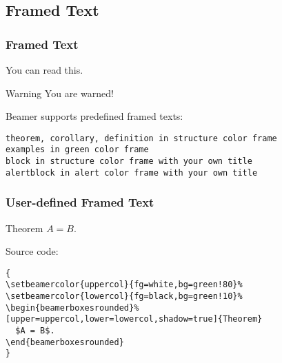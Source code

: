 \subsection{Framed Text}
\begin{frame}[fragile]
\frametitle{Framed Text}

  \begin{theorem}
    You can read this.
  \end{theorem}

  \begin{alertblock}{Warning}
    You are warned!
  \end{alertblock}

  \vfill

  Beamer supports predefined framed texts:

  \begin{footnotesize}
    \begin{verbatim}
theorem, corollary, definition in structure color frame
examples in green color frame
block in structure color frame with your own title
alertblock in alert color frame with your own title
    \end{verbatim}
  \end{footnotesize}

\end{frame}
\begin{frame}[fragile]
\frametitle{User-defined Framed Text}

{
  \begin{beamerboxesrounded}[upper=uppercol,lower=lowercol,shadow=true]{Theorem}
    $A = B$.
  \end{beamerboxesrounded}
}

  \vfill

  Source code:

  \begin{footnotesize}
    \begin{verbatim}
{
\setbeamercolor{uppercol}{fg=white,bg=green!80}%
\setbeamercolor{lowercol}{fg=black,bg=green!10}%
\begin{beamerboxesrounded}%
[upper=uppercol,lower=lowercol,shadow=true]{Theorem}
  $A = B$.
\end{beamerboxesrounded}
}
    \end{verbatim}
  \end{footnotesize}

\end{frame}
